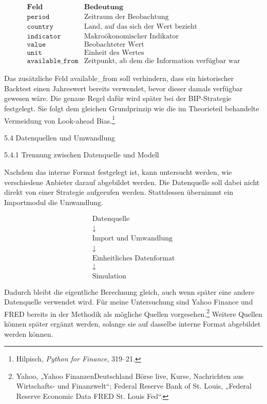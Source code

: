 \documentclass[
  ngerman,
  a4paper,
  DIV=11,
  oneside]{scrreprt}
\begin{document}
\[
\begin{array}{c|c}
\textbf{Feld} & \textbf{Bedeutung} \\
\hline
\texttt{period} & \text{Zeitraum der Beobachtung} \\
\texttt{country} & \text{Land, auf das sich der Wert bezieht} \\
\texttt{indicator} & \text{Makroökonomischer Indikator} \\
\texttt{value} & \text{Beobachteter Wert} \\
\texttt{unit} & \text{Einheit des Wertes} \\
\texttt{available\_from} & \text{Zeitpunkt, ab dem die Information verfügbar war}
\end{array}
\]

Das zusätzliche Feld available\_from soll verhindern, dass ein
historischer Backtest einen Jahreswert bereits verwendet, bevor dieser
damals verfügbar gewesen wäre. Die genaue Regel dafür wird später bei
der BIP-Strategie festgelegt. Sie folgt dem gleichen Grundprinzip wie
die im Theorieteil behandelte Vermeidung von Look-ahead Bias.\footnote{Hilpisch,
  \emph{Python for Finance}, 319--21.}

5.4 Datenquellen und Umwandlung

5.4.1 Trennung zwischen Datenquelle und Modell

Nachdem das interne Format festgelegt ist, kann untersucht werden, wie
verschiedene Anbieter darauf abgebildet werden. Die Datenquelle soll
dabei nicht direkt von einer Strategie aufgerufen werden. Stattdessen
übernimmt ein Importmodul die Umwandlung.

\[
\begin{array}{c}
\boxed{\text{Datenquelle}} \\[6pt]
\downarrow \\[6pt]
\boxed{\text{Import und Umwandlung}} \\[6pt]
\downarrow \\[6pt]
\boxed{\text{Einheitliches Datenformat}} \\[6pt]
\downarrow \\[6pt]
\boxed{\text{Simulation}}
\end{array}
\]

Dadurch bleibt die eigentliche Berechnung gleich, auch wenn später eine
andere Datenquelle verwendet wird. Für meine Untersuchung sind Yahoo
Finance und FRED bereits in der Methodik als mögliche Quellen
vorgesehen.\footnote{Yahoo, {„Yahoo FinanzenDeutschland \textbar{} Börse
  live, Kurse, Nachrichten aus Wirtschafts- und Finanzwelt``}; Federal
  Reserve Bank of St. Louis, {„Federal {Reserve Economic Data}
  \textbar{} {FRED} \textbar{} {St}. {Louis Fed}``}.} Weitere Quellen
können später ergänzt werden, solange sie auf dasselbe interne Format
abgebildet werden können.
\end{document}
